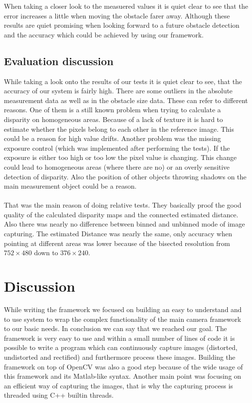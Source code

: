 \documentclass[11pt]{article}
\begin{document}
When taking a closer look to the measuered values it is quiet clear to see that the error increases a little when moving the obstacle farer away.
Although these results are quiet promising when looking forward to a future obstacle detection and the accuracy which could be achieved by using our framework.

\subsection{Evaluation discussion}
While taking a look onto the results of our tests it is quiet clear to see, that the accuracy of our system is fairly high. There are some outliers in the absolute measurement data as well as in the obstacle size data. These can refer to different reasons. One of them is a still known problem when trying to calculate a disparity on homogeneous areas. Because of a lack of texture it is hard to estimate whether the pixels belong to each other in the reference image. This could be a reason for high value drifts. Another problem was the missing exposure control (which was implemented after performing the tests). If the exposure is either too high or too low the pixel value is changing. This change could lead to homogeneous areas (where there are no) or an overly sensitive detection of disparity. Also the position of other objects throwing shadows on the main measurement object could be a reason. \\\\
That was the main reason of doing relative tests. They basically proof the good quality of the calculated disparity maps and the connected estimated distance. Also there was nearly no difference between binned and unbinned mode of image capturing. The estimated Distance was nearly the same, only accuracy when pointing at different areas was lower because of the bisected resolution from $752\times480$ down to $376\times240$.

\section{Discussion}
While writing the framework we focused on building an easy to understand and to use system to wrap the complex functionality of the main camera framework to our basic needs. In conclusion we can say that we reached our goal. The framework is very easy to use and within a small number of lines of code it is possible to write a program which can continuously capture images (distorted, undistorted and rectified) and furthermore process these images. Building the framework on top of OpenCV was also a good step because of the wide usage of this framework and its Matlab-like syntax. Another main point was focusing on an efficient way of capturing the images, that is why the capturing process is threaded using C++ builtin threads.
\end{document}
